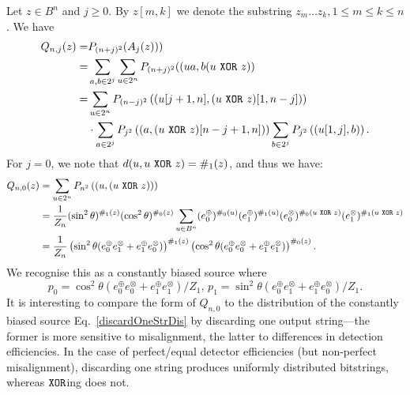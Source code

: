 \documentclass{mscs}
\newtheorem{Theorem}{Theorem}
\newcommand{\xor}{\text{ ${\tt XOR}$ }}
\begin{document}
	Let $z \in B^n$ and $j \ge 0$. By $z[m,k]$ we denote the substring $z_m\dots z_k, 1\le m \le k\le n$. We have
	\begin{align*}
		Q_{n,j}(z) =& P_{(n+j)^2}(A_j(z)))\\
		=& \sum_{a,b\in 2^j}\sum_{u\in 2^n}P_{(n+j)^2}((ua,b(u\xor z))\\
		=& \sum_{u\in 2^n}P_{(n-j)^2}\left((u[j+1,n],(u\xor z)[1,n-j])\right)  \\
		&\cdot \sum_{a\in 2^j}P_{j^2}\left((a,(u\xor z)[n-j+1,n])\right)  \sum_{b\in 2^j}P_{j^2}\left((u[1,j],b)\right).
	\end{align*}
	For $j=0$, we note that $d(u, u\xor z) = \#_1(z)$, and thus we have:
\begin{align*}
	Q_{n,0}(z) &= \sum_{u\in 2^n}P_{n^2}\left((u,(u\xor z))\right) \\
		&= \frac{1}{Z_n}(\sin^2\theta)^{\#_1(z)}(\cos^2\theta)^{\#_0(z)} \sum_{u\in B^n} (e_0^\oplus)^{\#_0(u)}(e_1^\oplus)^{\#_1(u)}(e_0^\otimes)^{\#_0(u\xor z)}(e_1^\otimes)^{\#_1(u\xor z)}\\
		&= \frac{1}{Z_n}\left(\sin^2\theta (e_0^\oplus e_1^\otimes + e_1^\oplus e_0^\otimes) \right)^{\#_1(z)}\left(\cos^2\theta (e_0^\oplus e_0^\otimes + e_1^\oplus e_1^\otimes) \right)^{\#_0(z)}.
\end{align*}
We recognise this as a constantly biased source where $$p_0 = \cos^2\theta (e_0^\oplus e_0^\otimes + e_1^\oplus e_1^\otimes)/Z_1,\, p_1 = \sin^2\theta (e_0^\oplus e_1^\otimes + e_1^\oplus e_0^\otimes)/Z_1.$$ It is interesting to compare the form of $Q_{n,0}$ to the distribution of the constantly biased source Eq.~\eqref{discardOneStrDis} by discarding one output string---the former is more sensitive to misalignment, the latter to differences in detection efficiencies. In the case of perfect/equal detector efficiencies (but non-perfect misalignment), discarding one string produces uniformly distributed bitstrings, whereas ${\tt XOR}$ing does not.
\end{document}
